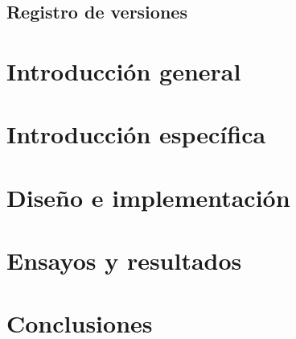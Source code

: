 \documentclass{report}
\begin{document}




\tableofcontents
\newpage

\section*{Registro de versiones}

\newpage

\chapter{Introducción general}


\chapter{Introducción específica}


\chapter{Diseño e implementación}


\chapter{Ensayos y resultados}


\chapter{Conclusiones}



\end{document}
